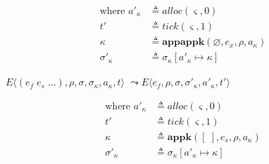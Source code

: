 \documentclass[12pt,draft]{article}
\begin{document}
{\begin{multicols*}{2}
\vspace{-7mm}
\begin{align*}
  \text{where }
  a'_\kappa &\triangleq alloc(\varsigma, 0) \\
  t' &\triangleq tick(\varsigma, 1) \\
  \kappa &\triangleq \textbf{appappk}(\varnothing, e_x, \rho, a_\kappa) \\
  \sigma'_\kappa &\triangleq \sigma_\kappa[a'_\kappa \mapsto \kappa]
\end{align*}
\begin{center}
  $E\langle (e_f\;e_s\;...) , \rho , \sigma , \sigma_\kappa , a_\kappa , t \rangle$
  $\leadsto E\langle e_f , \rho , \sigma , \sigma'_\kappa , a'_\kappa , t' \rangle$
\end{center}
\vspace{-5mm}
\begin{align*}
  \text{where }
  a'_\kappa &\triangleq alloc(\varsigma, 0) \\
  t' &\triangleq tick(\varsigma, 1) \\
  \kappa &\triangleq \textbf{appk}([\;], e_s, \rho, a_\kappa) \\
  \sigma'_\kappa &\triangleq \sigma_\kappa[a'_\kappa \mapsto \kappa]
\end{align*}
\end{multicols*}
} %


\newpage
\end{document}
